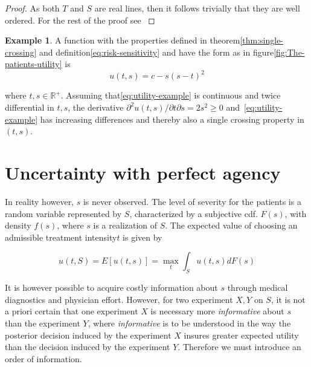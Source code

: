 \documentclass[10pt,a4paper]{article} %
\theoremstyle{definition}
\newtheorem{example}{Example}[section]
\theoremstyle{remark}
\begin{document}
\begin{proof}
As both $T$ and $S$ are real lines, then it follows trivially that
they are well ordered. For the rest of the proof see \citet{Milgrom1994}
\end{proof}

\begin{example}
A function with the properties defined in theorem\ref{thm:single-crossing}
and definition\ref{eq:risk-sensitivity} and have the form as in
figure\ref{fig:The-patients-utility} is
\begin{equation}
u(t,s)=c-s{(s-t)}^{2}\label{eq:utility-example}
\end{equation}

where $t,s\in\mathbb{R}^{+}$. Assuming that\eqref{eq:utility-example}
is continuous and twice differential in $t,s$, the derivative $\partial^{2}u(t,s)\big/\partial t\partial s=2s^{2}\ge0$
and~\eqref{eq:utility-example} has increasing differences and thereby
also a single crossing property in $(t,s)$.
\end{example}


\section{Uncertainty with perfect agency}

In reality however, $s$ is never observed. The level of severity
for the patients is a random variable represented by $S$, characterized
by a subjective cdf. $F(s)$, with density $f(s)$, where $s$ is a
realization of $S$. The expected value of choosing an admissible
treatment intensity$t$ is given by

\begin{equation}
u(t,S)=E[u(t,s)]=\max_{t}\int_{S}u(t,s)dF(s)\label{eq:expected-utility-prior}
\end{equation}

It is however possible to acquire costly information about $s$ through
medical diagnostics and physician effort. However, for two experiment
$X,Y$ on $S$, it is not a priori certain that one experiment $X$
is necessary more \emph{informative} about $s$ than the experiment
$Y$, where \emph{informative} is to be understood in the way the
posterior decision induced by the experiment $X$ insures greater
expected utility than the decision induced by the experiment $Y$.
Therefore we must introduce an order of information.
\end{document}
